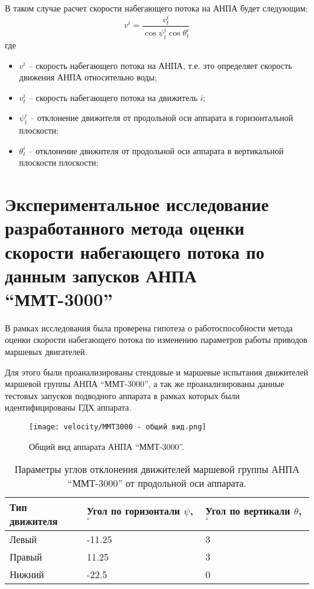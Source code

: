 В таком случае расчет скорости набегающего потока на АНПА будет следующим:
\begin{equation}
    \label{eq:velocity_orientation}
    v^i = \frac{v^i_t}{\cos{\psi^i_t}\cos{\theta^i_t}}
\end{equation}
\noindent где
\begin{itemize}
    \item $v^i$ -- скорость набегающего потока на АНПА, т.е. это определяет скорость движения АНПА относительно воды;
    \item $v^i_t$ -- скорость набегающего потока на движитель $i$;
    \item $\psi^i_t$ -- отклонение движителя от продольной оси аппарата в горизонтальной плоскости;
    \item $\theta^i_t$ -- отклонение движителя от продольной оси аппарата в вертикальной плоскости плоскости;
\end{itemize}

\section{Экспериментальное исследование разработанного метода оценки скорости набегающего потока по данным запусков АНПА ``ММТ-3000''}
В рамках исследования была проверена гипотеза о работоспособности метода оценки скорости набегающего потока по изменению параметров работы приводов маршевых двигателей.

Для этого были проанализированы стендовые и маршевые испытания движителей маршевой группы АНПА ``ММТ-3000'', а так же проанализированы данные тестовых запусков подводного аппарата в рамках которых были идентифицированы ГДХ аппарата.

\begin{figure}[ht]
    \centering
    \texttt{[image: velocity/MMT3000 - общий вид.png]}
    \caption{Общий вид аппарата АНПА ``ММТ-3000''.}
    \label{fig:mmt-3000}
\end{figure}

\begin{table}
    \caption{Параметры углов отклонения движителей маршевой группы АНПА ``ММТ-3000'' от продольной оси аппарата.}
    \label{tab:mmt3000_propulsion_angles}
    \centering
    \begin{tabular}{lll}
        \toprule
        Тип движителя & Угол по горизонтали $\psi$, $^{\circ}$  & Угол по вертикали $\theta$, $^{\circ}$ \\
        \midrule
        Левый  & -11.25 & 3 \\
        Правый &  11.25 & 3 \\
        Нижний &  -22.5 & 0 \\
        \bottomrule
    \end{tabular}
\end{table}

